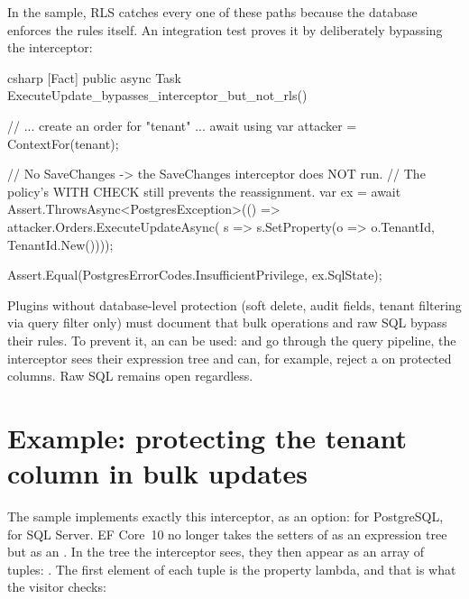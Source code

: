 In the sample, RLS catches every one of these paths because the database enforces the rules
itself. An integration test proves it by deliberately bypassing the interceptor:

\begin{sourcecode}{csharp}
[Fact]
public async Task ExecuteUpdate_bypasses_interceptor_but_not_rls()
{
    // ... create an order for "tenant" ...
    await using var attacker = ContextFor(tenant);

    // No SaveChanges -> the SaveChanges interceptor does NOT run.
    // The policy's WITH CHECK still prevents the reassignment.
    var ex = await Assert.ThrowsAsync<PostgresException>(() =>
        attacker.Orders.ExecuteUpdateAsync(
            s => s.SetProperty(o => o.TenantId, TenantId.New())));

    Assert.Equal(PostgresErrorCodes.InsufficientPrivilege, ex.SqlState);
}
\end{sourcecode}

\begin{important}
  Plugins without database-level protection (soft delete, audit fields, tenant filtering via
  query filter only) must document that bulk operations and raw SQL bypass their rules. To
  prevent it, an  can be used:
   and  go through the
  query pipeline, the interceptor sees their expression tree and can, for example, reject a
   on protected columns. Raw SQL remains open regardless.
\end{important}

\section{Example: protecting the tenant column in bulk updates}

The sample implements exactly this interceptor, as an option:
for PostgreSQL,  for SQL
Server. EF Core~10 no longer takes the setters of  as an
expression tree but as an .
In the tree the interceptor sees, they then appear as an array of tuples:
.
The first element of each tuple is the property lambda, and that is what the visitor checks:


